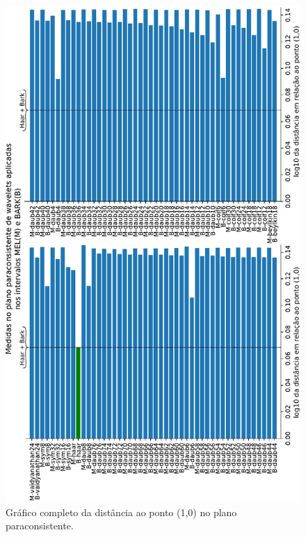 \begin{apendicesenv}
\begin{figure}[h]
				\includegraphics[width=0.99\linewidth]{images/results/paraconsistentPlane/ParaconsistentFull}
				\caption{Gráfico completo da distância ao ponto (1,0) no plano paraconsistente.}
				\label{fig:paraconsistentfull}
			\end{figure}
\end{apendicesenv}